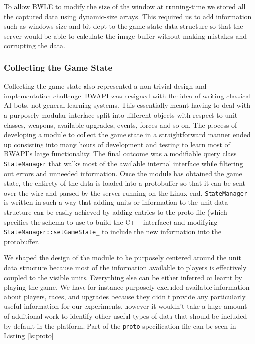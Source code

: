 To allow BWLE to modify the size of the window at running-time we stored all the
captured data using dynamic-size arrays. This required us to add information
such as windows size and bit-dept to the game state data structure so that the
server would be able to calculate the image buffer without making mistakes and
corrupting the data.


\subsubsection{Collecting the Game State}

Collecting the game state also represented a non-trivial design and
implementation challenge. BWAPI was designed with the idea of writing classical
AI bots, not general learning systems. This essentially meant having to deal
with a purposely modular interface split into different objects with respect to
unit classes, weapons, available upgrades, events, forces and so on. The process
of developing a module to collect the game state in a straightforward manner
ended up consisting into many hours of development and testing to learn most of
BWAPI's large functionality. The final outcome was a modifiable query class
\texttt{StateManager} that walks most of the available internal interface while
filtering out errors and unneeded information. Once the module has obtained the
game state, the entirety of the data is loaded into a protobuffer so that it can
be sent over the wire and parsed by the server running on the Linux end.
\texttt{StateManager} is written in such a way that adding units or information
to the unit data structure can be easily achieved by adding entries to the proto
file (which specifies the schema to use to build the C++ interface) and
modifying \texttt{StateManager::setGameState\_} to include the new information
into the protobuffer.

We shaped the design of the module to be purposely centered around the unit data
structure because most of the information available to players is effectively
coupled to the visible units. Everything else can be either inferred or learnt
by playing the game. We have for instance purposely excluded available
information about players, races, and upgrades because they didn't provide any
particularly useful information for our experiments, however it wouldn't take a
huge amount of additional work to identify other useful types of data that
should be included by default in the platform. Part of the \texttt{proto}
specification file can be seen in Listing \ref{ls:proto}


